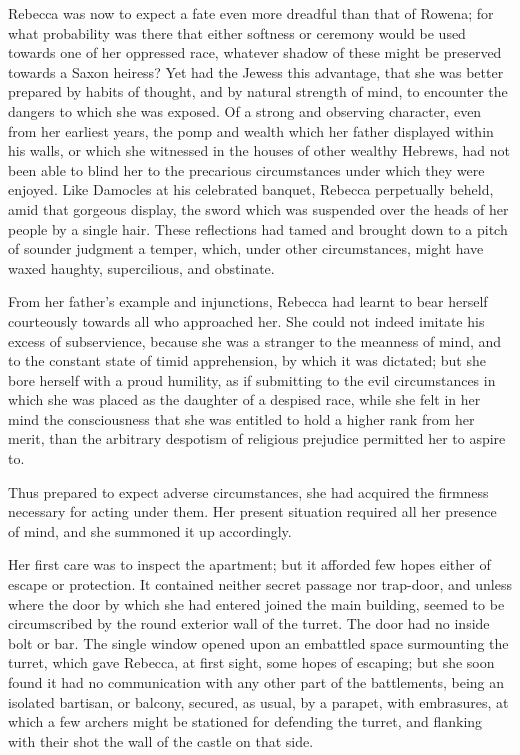 Rebecca was now to expect a fate even more dreadful than that of Rowena;
for what probability was there that either softness or ceremony would be
used towards one of her oppressed race, whatever shadow of these might
be preserved towards a Saxon heiress? Yet had the Jewess this advantage,
that she was better prepared by habits of thought, and by natural
strength of mind, to encounter the dangers to which she was exposed. Of
a strong and observing character, even from her earliest years, the pomp
and wealth which her father displayed within his walls, or which she
witnessed in the houses of other wealthy Hebrews, had not been able to
blind her to the precarious circumstances under which they were enjoyed.
Like Damocles at his celebrated banquet, Rebecca perpetually beheld,
amid that gorgeous display, the sword which was suspended over the heads
of her people by a single hair. These reflections had tamed and brought
down to a pitch of sounder judgment a temper, which, under other
circumstances, might have waxed haughty, supercilious, and obstinate.

From her father's example and injunctions, Rebecca had learnt to bear
herself courteously towards all who approached her. She could not indeed
imitate his excess of subservience, because she was a stranger to the
meanness of mind, and to the constant state of timid apprehension, by
which it was dictated; but she bore herself with a proud humility, as if
submitting to the evil circumstances in which she was placed as the
daughter of a despised race, while she felt in her mind the
consciousness that she was entitled to hold a higher rank from her
merit, than the arbitrary despotism of religious prejudice permitted her
to aspire to.

Thus prepared to expect adverse circumstances, she had acquired the
firmness necessary for acting under them. Her present situation required
all her presence of mind, and she summoned it up accordingly.

Her first care was to inspect the apartment; but it afforded few hopes
either of escape or protection. It contained neither secret passage nor
trap-door, and unless where the door by which she had entered joined the
main building, seemed to be circumscribed by the round exterior wall of
the turret. The door had no inside bolt or bar. The single window opened
upon an embattled space surmounting the turret, which gave Rebecca, at
first sight, some hopes of escaping; but she soon found it had no
communication with any other part of the battlements, being an isolated
bartisan, or balcony, secured, as usual, by a parapet, with embrasures,
at which a few archers might be stationed for defending the turret, and
flanking with their shot the wall of the castle on that side.

